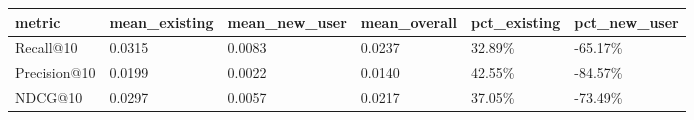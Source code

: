 \begin{tabular}{llllll}
\toprule
metric & mean_existing & mean_new_user & mean_overall & pct_existing & pct_new_user \\
\midrule
Recall@10 & 0.0315 & 0.0083 & 0.0237 & 32.89\% & -65.17\% \\
Precision@10 & 0.0199 & 0.0022 & 0.0140 & 42.55\% & -84.57\% \\
NDCG@10 & 0.0297 & 0.0057 & 0.0217 & 37.05\% & -73.49\% \\
\bottomrule
\end{tabular}
